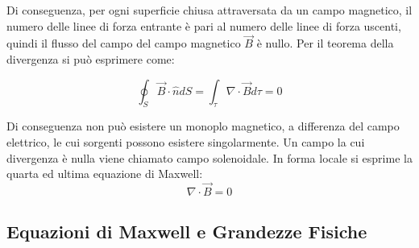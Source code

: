 \documentclass{article}
\numberwithin{equation}{subsection}
\begin{document}
\begin{center}
\end{center}

Di conseguenza, per ogni superficie chiusa attraversata da un campo magnetico, il numero delle linee di forza entrante è pari al numero delle linee di forza uscenti, quindi 
il flusso del campo del campo magnetico $\vec{B}$ è nullo. Per il teorema della divergenza si può esprimere come:

\begin{equation}
    \displaystyle\oint_{S}\vec{B}\cdot\hat{n}dS=\int_{\tau}\nabla\cdot\vec{B}d\tau=0
\end{equation}

Di conseguenza non può esistere un monoplo magnetico, a differenza del campo elettrico, le cui sorgenti possono esistere singolarmente. Un campo la cui divergenza è nulla 
viene chiamato campo solenoidale. In forma locale si esprime la quarta ed ultima equazione di Maxwell:
\begin{equation}
    \nabla\cdot\vec{B}=0
\end{equation}

\subsection{Equazioni di Maxwell e Grandezze Fisiche}
\end{document}

